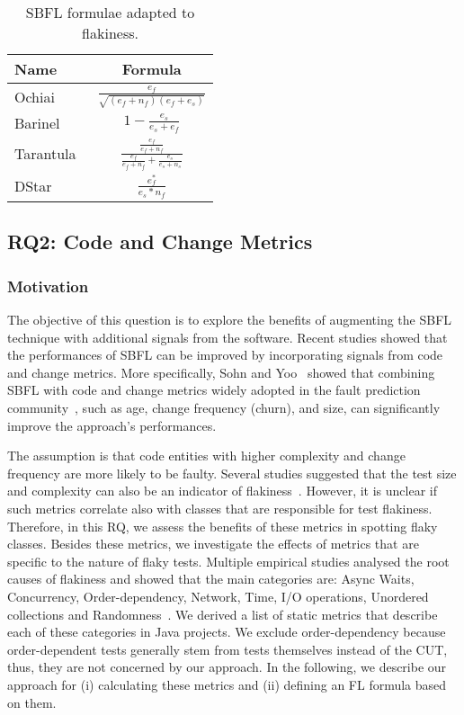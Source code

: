 \begin{table}
\vspace{-0.5em}
\centering
\caption{SBFL formulae adapted to flakiness.
\centering}
\label{tab:formulae}
\begin{tabular}{lc} 
\toprule
 \textbf{{Name}} & \textbf{{
Formula}}   \\  \midrule
Ochiai~\cite{Abreu:2006yf} & $\frac{e_f}{\sqrt{(e_f + n_f)(e_f + e_s)}}$ \\ 
Barinel~\cite{abreu2009spectrum} & $1 - \frac{e_s}{e_s + e_f}$ \\ 
Tarantula~\cite{Jones:2001vn,Jones:2002kx} & $\frac{\frac{e_f}{e_f+n_f}}{\frac{e_f}{e_f+n_f}+\frac{e_s}{e_s+n_s}}$ \\
DStar~\cite{wong-dstar} & $\frac{e_f^*}{e_s * n_f}$ \\
\bottomrule
\end{tabular}
\end{table}

\subsection{RQ2: Code and Change Metrics}
\subsubsection{Motivation}

The objective of this question is to explore the benefits of augmenting the SBFL technique with additional signals from the software.
Recent studies showed that the performances of SBFL can be improved by incorporating signals from code and change metrics.
More specifically, Sohn and Yoo~\cite{sohn-TSE} showed that combining SBFL with code and change metrics widely adopted in the fault prediction community~\cite{McI:2018:tse}, such as age, change frequency (\ie churn), and size, can significantly improve the approach's performances.

The assumption is that code entities with higher complexity and change frequency are more likely to be faulty.
Several studies suggested that the test size and complexity can also be an indicator of flakiness~\cite{Pinto2020,King2018,camara2021use}. 
However, it is unclear if such metrics correlate also with classes that are responsible for test flakiness.
Therefore, in this RQ, we assess the benefits of these metrics in spotting flaky classes.
Besides these metrics, we investigate the effects of metrics that are specific to the nature of flaky tests.
Multiple empirical studies analysed the root causes of flakiness and showed that the main categories are: Async Waits, Concurrency, Order-dependency, Network, Time, I/O operations, Unordered collections and Randomness~\cite{Luo2014,Parry2021,Lam2020a,Gruber2021}.
We derived a list of static metrics that describe each of these categories in Java projects.
We exclude order-dependency because order-dependent tests generally stem from tests themselves instead of the CUT, thus, they are not concerned by our approach.
In the following, we describe our approach for (i) calculating these metrics and (ii) defining an FL formula based on them.

